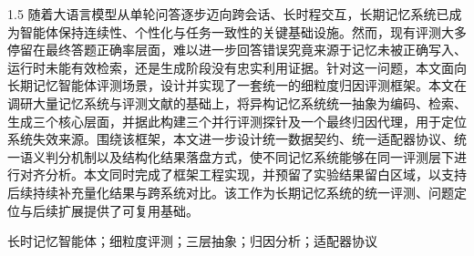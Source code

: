 
\begin{zhaiyao}
\begin{spacing}{1.5}
随着大语言模型从单轮问答逐步迈向跨会话、长时程交互，长期记忆系统已成为智能体保持连续性、个性化与任务一致性的关键基础设施。然而，现有评测大多停留在最终答题正确率层面，难以进一步回答错误究竟来源于记忆未被正确写入、运行时未能有效检索，还是生成阶段没有忠实利用证据。针对这一问题，本文面向长期记忆智能体评测场景，设计并实现了一套统一的细粒度归因评测框架。本文在调研大量记忆系统与评测文献的基础上，将异构记忆系统统一抽象为编码、检索、生成三个核心层面，并据此构建三个并行评测探针及一个最终归因代理，用于定位系统失效来源。围绕该框架，本文进一步设计统一数据契约、统一适配器协议、统一语义判分机制以及结构化结果落盘方式，使不同记忆系统能够在同一评测层下进行对齐分析。本文同时完成了框架工程实现，并预留了实验结果留白区域，以支持后续持续补充量化结果与跨系统对比。该工作为长期记忆系统的统一评测、问题定位与后续扩展提供了可复用基础。
\end{spacing}

\vspace{\baselineskip}

\hspace*{2em}长时记忆智能体；细粒度评测；三层抽象；归因分析；适配器协议
\end{zhaiyao}

